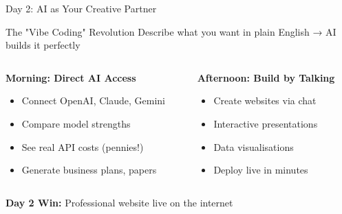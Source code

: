 \documentclass{beamer}
\begin{document}
\begin{frame}{Day 2: AI as Your Creative Partner}
\begin{block}{The "Vibe Coding" Revolution}
Describe what you want in plain English → AI builds it perfectly
\end{block}
\vspace{0.5em}
\begin{columns}[T]
\begin{column}{0.5\textwidth}
\textbf{Morning: Direct AI Access}
\begin{itemize}
\item Connect OpenAI, Claude, Gemini
\item Compare model strengths
\item See real API costs (pennies!)
\item Generate business plans, papers
\end{itemize}
\end{column}
\begin{column}{0.5\textwidth}
\textbf{Afternoon: Build by Talking}
\begin{itemize}
\item Create websites via chat
\item Interactive presentations
\item Data visualisations
\item Deploy live in minutes
\end{itemize}
\end{column}
\end{columns}
\vspace{0.5em}
\textcolor{successgreen}{\faCheckCircle} \textbf{Day 2 Win:} Professional website live on the internet
\end{frame}
\end{document}
